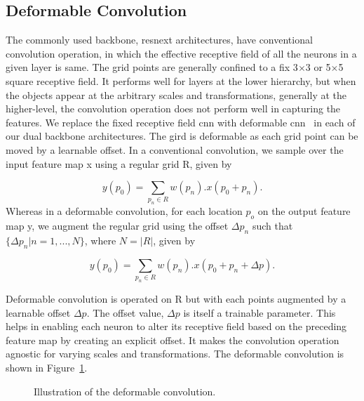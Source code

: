 \documentclass[a4paper,conference]{IEEEtran}
\begin{document}
\subsection{Deformable Convolution}

The commonly used backbone, {\sc r}es{\sc n}e{\sc x}t architectures, have conventional convolution operation, in which the effective receptive field of all the neurons in a given layer is same. The grid points are generally confined to a fix 3$\times$3 or 5$\times$5 square receptive field. It performs well for layers at the lower hierarchy, but when the objects appear at the arbitrary scales and transformations, generally at the higher-level, the convolution operation does not perform well in capturing the features. We replace the fixed receptive field {\sc cnn} with deformable {\sc cnn}~\cite{dai2017deformable} in each of our dual backbone architectures. The gird is deformable as each grid point can be moved by a learnable offset. In a conventional convolution, we sample over the input feature map x using a regular grid R, given by

\begin{equation}
  y(p_0) = \sum_{p_n\in R} w(p_n).x(p_0 +p_n).  
\end{equation}
Whereas in a deformable convolution, for each location $p_o$ on the output feature map y,  we augment the regular grid using the offset $\Delta p_n$ such that $\{\Delta p_n |n= 1,...,N\}$, where $N=|R|$, given by

\begin{equation}
y(p_0) = \sum_{p_n\in R} w(p_n).x(p_0 +p_n +\Delta p). 
\end{equation}

 Deformable convolution is operated on R but with each points augmented by a learnable offset $\Delta p$. The offset value, $\Delta p$ is itself a trainable parameter. This helps in enabling each neuron to alter its receptive field based on the preceding feature map by creating an explicit offset. It makes the convolution operation agnostic for varying scales and transformations. The deformable convolution is shown in Figure~\ref{fig:deformable}.

\begin{figure}[ht!]
\centerline{
}
\caption{Illustration of the deformable convolution. \label{fig:deformable}}
\end{figure}
\end{document}
